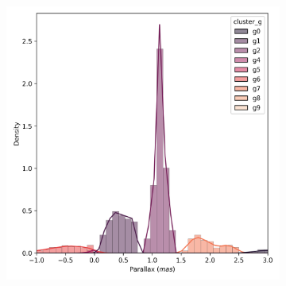 \documentclass[preprint,12pt,authoryear]{elsarticle}
\begin{document}
\begin{figure}[!hbt]
\begin{subfigure}{0.29\textwidth}
  \end{subfigure}
  \begin{subfigure}{0.29\textwidth}
    \includegraphics[width=\textwidth]{../figures/ngc_2682/dec_parallax_filtered_ngc_2682.png}
  \end{subfigure}


\end{figure}
\end{document}
